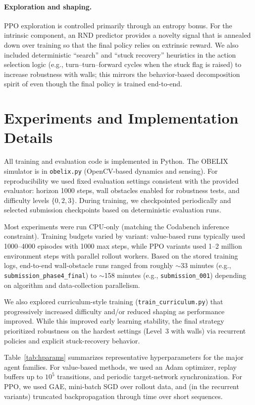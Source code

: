 \documentclass[11pt, oneside]{article}    %
\begin{document}
\paragraph{Exploration and shaping.}
PPO exploration is controlled primarily through an entropy bonus. For the intrinsic component, an RND predictor provides a novelty signal that is annealed down over training so that the final policy relies on extrinsic reward. We also included deterministic ``search'' and ``stuck recovery'' heuristics in the action selection logic (e.g., turn--turn--forward cycles when the stuck flag is raised) to increase robustness with walls; this mirrors the behavior-based decomposition spirit of \citep{mahadevan1991automatic} even though the final policy is trained end-to-end.

\section{Experiments and Implementation Details}
All training and evaluation code is implemented in Python. The OBELIX simulator is in \texttt{obelix.py} (OpenCV-based dynamics and sensing). For reproducibility we used fixed evaluation settings consistent with the provided evaluator: horizon 1000 steps, wall obstacles enabled for robustness tests, and difficulty levels $\{0,2,3\}$. During training, we checkpointed periodically and selected submission checkpoints based on deterministic evaluation runs.

Most experiments were run CPU-only (matching the Codabench inference constraint). Training budgets varied by variant: value-based runs typically used 1000--4000 episodes with 1000 max steps, while PPO variants used 1--2 million environment steps with parallel rollout workers. Based on the stored training logs, end-to-end wall-obstacle runs ranged from roughly $\sim$33 minutes (e.g., \texttt{submission\_phase4\_final}) to $\sim$158 minutes (e.g., \texttt{submission\_001}) depending on algorithm and data-collection parallelism.

We also explored curriculum-style training (\texttt{train\_curriculum.py}) that progressively increased difficulty and/or reduced shaping as performance improved. While this improved early learning stability, the final strategy prioritized robustness on the hardest settings (Level~3 with walls) via recurrent policies and explicit stuck-recovery behavior.

Table~\ref{tab:hparams} summarizes representative hyperparameters for the major agent families. For value-based methods, we used an Adam optimizer, replay buffers up to $10^5$ transitions, and periodic target-network synchronization. For PPO, we used GAE, mini-batch SGD over rollout data, and (in the recurrent variants) truncated backpropagation through time over short sequences.
\end{document}
